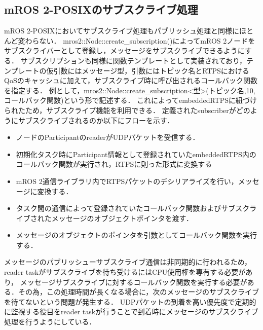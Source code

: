 \subsection{mROS 2-POSIXのサブスクライブ処理}
mROS 2-POSIXにおいてサブスクライブ処理もパブリッシュ処理と同様にほとんど変わらない．
mros2::Node::create\_subscription()によってmROS 2ノードをサブスクライバーとして登録し，メッセージをサブスクライブできるようにする．
サブスクリプションも同様に関数テンプレートとして実装されており，テンプレートの仮引数にはメッセージ型，引数にはトピック名とRTPSにおけるQoSのキャッシュに加えて，サブスクライブ時に呼び出されるコールバック関数を指定する．
例として，mros2::Node::create\_subscription<型>(トピック名,10,コールバック関数)という形で記述する．
これによってembeddedRTPSに紐づけられたため，サブスクライブ機能を利用できる．
定義されたsubscriberがどのようにサブスクライブされるのか以下にフローを示す．
\begin{itemize}
    \item ノードのParticipantのreaderがUDPパケットを受信する．
    \item 初期化タスク時にParticipant情報として登録されていたembeddedRTPS内のコールバック関数が実行され，RTPSに則った形式に変換する
    \item mROS 2通信ライブラリ内でRTPSパケットのデシリアライズを行い，メッセージに変換する．
    \item タスク間の通信によって登録されていたコールバック関数およびサブスクライブされたメッセージのオブジェクトポインタを渡す．
    \item メッセージのオブジェクトのポインタを引数としてコールバック関数を実行する．
\end{itemize}
メッセージのパブリッシューサブスクライブ通信は非同期的に行われるため，reader taskがサブスクライブを待ち受けるにはCPU使用権を専有する必要があり，
メッセージサブスクライブに対するコールバック関数を実行する必要がある．その為，この処理時間が長くなる場合に，次のメッセージのサブスクライブを待てないという問題が発生する．
UDPパケットの到着を高い優先度で定期的に監視する役目をreader taskが行うことで到着時にメッセージのサブスクライブ処理を行うようにしている．
